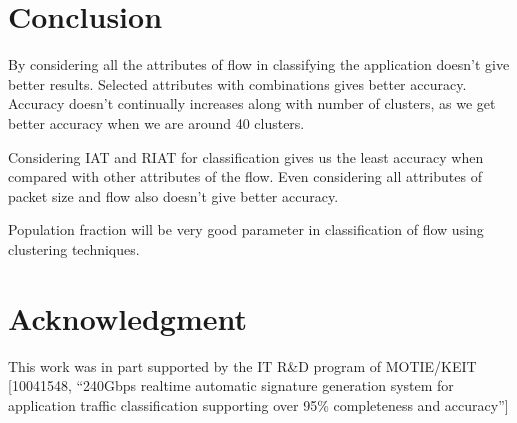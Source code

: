 \documentclass[conference]{IEEEtran}
\begin{document}



\section{Conclusion}
\label{sec:conc}
By considering all the attributes of flow in classifying the application doesn't give better results. Selected attributes with combinations gives better accuracy. Accuracy doesn't continually increases along with number of clusters, as we get better accuracy when we are around 40 clusters. 

Considering IAT and RIAT for classification gives us the least accuracy when compared with other attributes of the flow. Even considering all attributes of packet size and flow also doesn't give better accuracy. 

Population fraction will be very good parameter in classification of flow using clustering techniques. 




\section*{Acknowledgment}
This work was in part supported by the IT R\&D program of MOTIE/KEIT
[10041548,
``240Gbps realtime automatic signature generation
system for application traffic classification supporting over 95\%
completeness and accuracy'']







%






\end{document}
